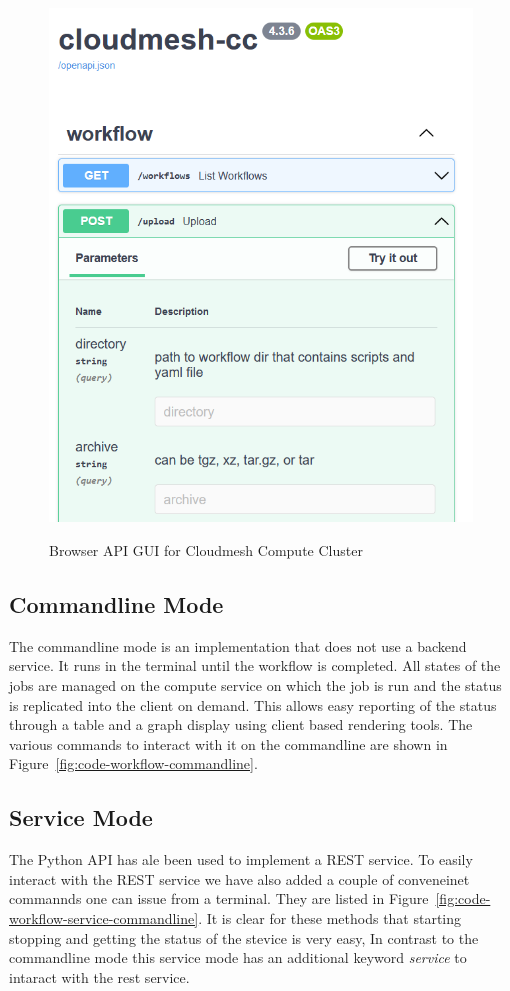 \begin{figure}[htb]
{\centering
\includegraphics[width=0.52\columnwidth]{images/upload_api.png}
}
\caption{Browser API GUI for Cloudmesh Compute Cluster}

\label{fig:openapi}

\end{figure}


\subsection{Commandline Mode}

The commandline mode is an implementation that does not use a backend
service. It runs in the terminal until the workflow is completed. All
states of the jobs are managed on the compute service on which the job
is run and the status is replicated into the client on demand. This
allows easy reporting of the status through a table and a graph
display using client based rendering tools. The various commands to
interact with it on the commandline are shown in
Figure~\ref{fig:code-workflow-commandline}.


\subsection{Service Mode}

The Python API has ale been used to implement a REST service. To
easily interact with the REST service we have also added a couple of
conveneinet commannds one can issue from a terminal. They are listed
in Figure~\ref{fig:code-workflow-service-commandline}. It is clear for
these methods that starting stopping and getting the status of the
stevice is very easy, In contrast to the commandline mode this service
mode has an additional keyword {\em service} to intaract with the rest service.

